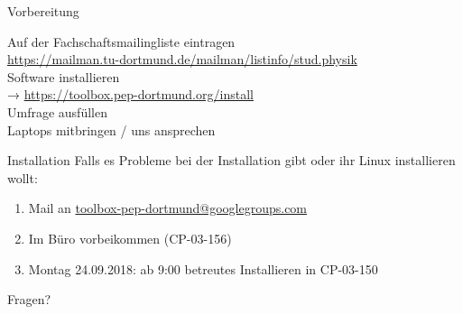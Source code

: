 \begin{frame}{Vorbereitung}
  \begin{center}
    \huge
    Auf der Fachschaftsmailingliste eintragen \\
    \url{https://mailman.tu-dortmund.de/mailman/listinfo/stud.physik}\\[0.5\baselineskip]
    Software installieren\\
    → \textcolor{blue!70!black}{\url{https://toolbox.pep-dortmund.org/install}}\\[0.5\baselineskip]
    Umfrage ausfüllen\\[0.5\baselineskip]
    Laptops mitbringen / uns ansprechen
  \end{center}
\end{frame}
\begin{frame}{Installation}
  \huge
  Falls es Probleme bei der Installation gibt oder ihr Linux installieren wollt:\\[0.5\baselineskip]
  \begin{enumerate}
    \item Mail an \href{mailto:toolbox-pep-dortmund@googlegroups.com}{toolbox-pep-dortmund@googlegroups.com}
    \item Im Büro vorbeikommen (CP-03-156)
    \item Montag 24.09.2018: ab 9:00 betreutes Installieren in CP-03-150
  \end{enumerate}
\end{frame}
\begin{frame}
  \Huge\centering
  \textcolor{red!70!black}{Fragen?}
\end{frame}


